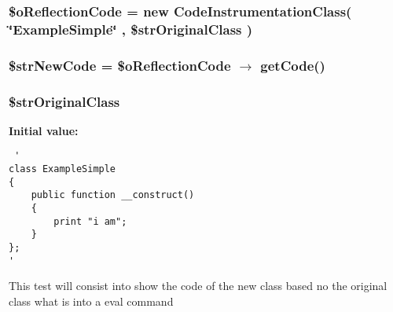 \hypertarget{test2_8php_dff853bfc3335950f89bfb9e1a779c7e}{
\subsubsection[{\$oReflectionCode}]{\setlength{\rightskip}{0pt plus 5cm}\$oReflectionCode = new {\bf CodeInstrumentationClass}( \char`\"{}ExampleSimple\char`\"{} , \$strOriginalClass )}}
\label{test2_8php_dff853bfc3335950f89bfb9e1a779c7e}


\hypertarget{test2_8php_882f0b62de6f379d0e0cf88ef6658601}{
\subsubsection[{\$strNewCode}]{\setlength{\rightskip}{0pt plus 5cm}\$strNewCode = \$oReflectionCode $\rightarrow$ getCode()}}
\label{test2_8php_882f0b62de6f379d0e0cf88ef6658601}


\hypertarget{test2_8php_1ac33ebb6e938d93add7631fafed358a}{
\subsubsection[{\$strOriginalClass}]{\setlength{\rightskip}{0pt plus 5cm}\$strOriginalClass}}
\label{test2_8php_1ac33ebb6e938d93add7631fafed358a}


\textbf{Initial value:}

\begin{Code}\begin{verbatim} '
class ExampleSimple
{
    public function __construct()
    {
        print "i am";
    }
};
'
\end{verbatim}
\end{Code}
This test will consist into show the code of the new class based no the original class what is into a eval command 